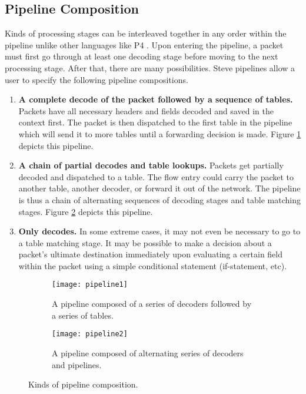 \subsection{Pipeline Composition} \label{pipeline_comp_desc}

Kinds of processing stages can be interleaved together in any order within the
pipeline unlike other languages like P4 \cite{p42014, p4_spec}. 
Upon entering the pipeline, a packet must first go through at least one decoding
stage before moving to the next processing stage. After that, there are many
possibilities.
Steve pipelines allow a user to specify the following pipeline compositions.

\begin{enumerate} 
\item \textbf{A complete decode of the packet followed by a
sequence of tables.} Packets have all necessary headers and fields decoded and
saved in the context first. The packet is then dispatched to the first table in
the pipeline which will send it to more tables until a forwarding decision is made.
Figure \ref{fg:pipeline1} depicts this pipeline.

\item \textbf{A chain of partial decodes and table lookups.} Packets get
partially decoded and dispatched to a table. The flow entry could carry the
packet to another table, another decoder, or forward it out of the network. The
pipeline is thus a chain of alternating sequences of decoding stages and table
matching stages. 
Figure \ref{fg:pipeline2} depicts this pipeline.

\item \textbf{Only decodes.} In some extreme cases, it may not
even be necessary to go to a table matching stage. It may be possible to make a
decision about a packet’s ultimate destination immediately upon evaluating a
certain field within the packet using a simple conditional statement
(if-statement, etc).
\end{enumerate}

\begin{figure}[ht]
\begin{subfigure}[t]{\linewidth}
  \centering
  \texttt{[image: pipeline1]}
  \caption{A pipeline composed of a series of decoders followed by a series
  of tables.}
  \label{fg:pipeline1}
\end{subfigure}
\hfill
\begin{subfigure}[t]{0.95\linewidth}
  \centering
  \texttt{[image: pipeline2]}
  \caption{A pipeline composed of alternating series of decoders and pipelines.}
  \label{fg:pipeline2}
\end{subfigure}

\caption{Kinds of pipeline composition.}
\label{fg:ContextEnv}
\end{figure}

